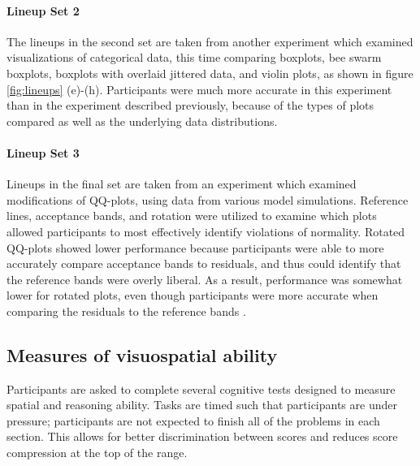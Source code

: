 \documentclass[journal]{vgtc}\usepackage[]{graphicx}\usepackage[]{color}
\begin{document}
\paragraph{Lineup Set 2}
The lineups in the second set are taken from another experiment which examined visualizations of categorical data, this time comparing boxplots, bee swarm boxplots, boxplots with overlaid jittered data, and violin plots, as shown in figure \ref{fig:lineups} (e)-(h). Participants were much more accurate in this experiment than in the experiment described previously, because of the types of plots compared as well as the underlying data distributions. 

\paragraph{Lineup Set 3}
Lineups in the final set are taken from an experiment which examined modifications of QQ-plots, using data from various model simulations. Reference lines, acceptance bands, and rotation were utilized to examine which plots allowed participants to most effectively identify violations of normality. Rotated QQ-plots showed lower performance because participants were able to more accurately compare acceptance bands to residuals, and thus could identify that the reference bands were overly liberal. As a result, performance was somewhat lower for rotated plots, even though participants were more accurate when comparing the residuals to the reference bands \cite{loy:2015}.

\subsection{Measures of visuospatial ability}

Participants are asked to complete several cognitive tests designed to measure spatial and reasoning ability. Tasks are timed such  that participants are under pressure; participants are not expected to finish all of the problems in each section. This allows for better discrimination between scores and reduces score compression at the top of the range. 
\end{document}
